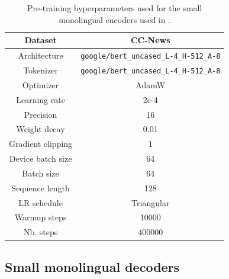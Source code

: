 \begin{appendices}
\begin{table}[H]
\centering
\small
\begin{tabular}{c|c}
\toprule
Dataset & CC-News  \\ \hline
Architecture & \texttt{google/bert\_uncased\_L-4\_H-512\_A-8} \\ \hline
Tokenizer & \texttt{google/bert\_uncased\_L-4\_H-512\_A-8} \\ \hline
Optimizer         & AdamW      \\ \hline
Learning rate     & 2e-4       \\ \hline
Precision  & 16 \\ \hline
Weight decay      & 0.01       \\ \hline
Gradient clipping & 1          \\ \hline
Device batch size        & 64         \\ \hline
Batch size        & 64        \\ \hline
Sequence length   & 128        \\ \hline
LR schedule       & Triangular \\ \hline
Warmup steps      & 10000      \\ \hline
Nb. steps         & 400000        \\ \bottomrule
\end{tabular}
\caption{Pre-training hyperparameters used for the small monolingual encoders used in .}
\end{table}

\subsection{Small monolingual decoders}
\label{app:s_train_mono_dec}



\end{appendices}
